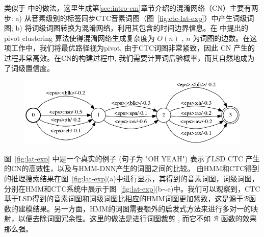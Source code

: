 类似于 \cite{evermann2000large}中的做法，这里生成第\ref{sec:intro-cm}章节介绍的混淆网络（CN）主要有两步: a) 从音素级别的标签同步CTC音素词图（图~\ref{fig:ctc-lat-exp}）中产生词级词图; b) 将词级词图转换为混淆网络，利用其包含的时间边界信息。在 \cite{hakkani2006beyond}中提出的 pivot clustering 算法使得混淆网络生成复杂度为 $O(n)$ , $n$ 为词图的边数。在这项工作中，我们将最优路径视为pivot, 由于CTC词图非常紧致，因此 CN 产生的过程非常高效。在CN的构建过程中, 我们需要计算词后验概率，而其自然地成为了词级置信度。



\begin{figure}[!htp]
  \centering
    \captionstyle{\centering}
    \includegraphics[width=\textwidth]{figure/ctc_lat.png}
\end{figure}


图~\ref{fig:lat-exp} 中是一个真实的例子 (句子为 "OH YEAH") 表示了LSD CTC 产生的CN的高效性，以及与HMM-DNN产生的词图之间的比较。
由HMM和CTC得到的推理搜索结果在图~\ref{fig:lat-exp}(a)中进行显示，其得到的音素词图，词级词图，分别在HMM和CTC系统中展示于图~\ref{fig:lat-exp}(b$\sim$e)中。我们可以观察到，CTC基于LSD得到的音素词图和词级词图比相应的HMM词图更加紧致，这是源于$\mathcal{B}$函数的建模结果。另一方面，HMM的词图需要额外的启发式方法来进行多对一的映射，以便去除词图冗余性。这里的做法是进行词图裁剪 \cite{siniscalchi2013bottom}, 而它不如 $\mathcal{B}$ 函数的效果那么强。


